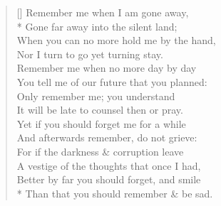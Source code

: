 \documentclass[MAIN]{subfiles}
\begin{document}
\settowidth{\versewidth}{You tell me of our future that you planned}
\begin{verse}[\versewidth]
Remember me when I am gone away,\\* 
\vin Gone far away into the silent land;\\
\vin When you can no more hold me by the hand,\\
Nor I  turn to go yet turning stay.\\
Remember me when no more day by day\\
\vin You tell me of our future that you planned:\\
\vin Only remember me; you understand\\
It will be late to counsel then or pray.\\
Yet if you should forget me for a while\\
\vin And afterwards remember, do not grieve:\\
\vin For if the darkness \& corruption leave\\
\vin \vin A vestige of the thoughts that once I had,\\
Better by far you should forget, and smile\\*
\vin \vin Than that you should remember \& be sad.
\end{verse}
\end{document}
